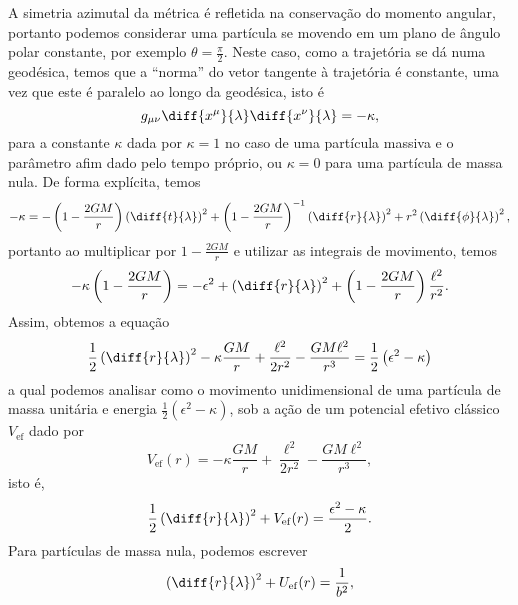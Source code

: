 A simetria azimutal da métrica é refletida na conservação do momento angular, portanto podemos considerar uma partícula se movendo em um plano de ângulo polar constante, por exemplo \(\theta = \frac{\pi}{2}\). Neste caso, como a trajetória se dá numa geodésica, temos que a \enquote{norma} do vetor tangente à trajetória é constante, uma vez que este é paralelo ao longo da geodésica, isto é
\begin{equation*}
    g_{\mu\nu}\diff{x^\mu}{\lambda} \diff{x^\nu}{\lambda} = -\kappa,
\end{equation*}
para a constante \(\kappa\) dada por \(\kappa = 1\) no caso de uma partícula massiva e o parâmetro afim dado pelo tempo próprio, ou \(\kappa = 0\) para uma partícula de massa nula. De forma explícita, temos
\begin{equation*}
    -\kappa = -\left(1 - \frac{2GM}{r}\right)\left(\diff{t}{\lambda}\right)^2 + \left(1 - \frac{2GM}{r}\right)^{-1}\left(\diff{r}{\lambda}\right)^2 + r^2\left(\diff{\phi}{\lambda}\right)^2,
\end{equation*}
portanto ao multiplicar por \(1 - \frac{2GM}{r}\) e utilizar as integrais de movimento, temos
\begin{equation*}
    -\kappa\left(1 - \frac{2GM}{r}\right) = - \epsilon^2 + \left(\diff{r}{\lambda}\right)^2 + \left(1 - \frac{2GM}{r}\right)\frac{\ell^2}{r^2}.
\end{equation*}
Assim, obtemos a equação
\begin{equation*}
    \frac12\left(\diff{r}{\lambda}\right)^2 - \kappa \frac{GM}{r} + \frac{\ell^2}{2r^2} - \frac{GM\ell^2}{r^3} = \frac12 \left(\epsilon^2 - \kappa\right)
\end{equation*}
a qual podemos analisar como o movimento unidimensional de uma partícula de massa unitária  e energia \(\frac12 \left(\epsilon^2 - \kappa\right)\), sob a ação de um potencial efetivo clássico \(V_\mathrm{ef}\) dado por
\begin{equation*}
    V_\mathrm{ef}(r) = - \kappa \frac{GM}{r} + \frac{\ell^2}{2r^2} - \frac{GM\ell^2}{r^3},
\end{equation*}
isto é,
\begin{equation*}
    \frac12 \left(\diff{r}{\lambda}\right)^2 + V_\mathrm{ef}(r) = \frac{\epsilon^2 - \kappa}2.
\end{equation*}
Para partículas de massa nula, podemos escrever
\begin{equation*}
    \left(\diff{r}{\lambda}\right)^2 + U_\mathrm{ef}(r) = \frac{1}{b^2},
\end{equation*}

